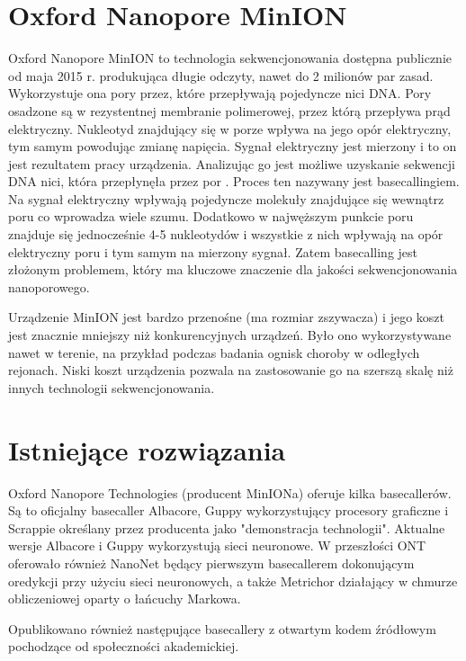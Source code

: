 \documentclass[a4paper,11pt,twoside]{report}
\theoremstyle{definition}
\begin{document}
\section{Oxford Nanopore MinION}

Oxford Nanopore MinION to technologia sekwencjonowania dostępna publicznie od maja 2015 r. produkująca długie odczyty, nawet do 2 milionów par zasad. Wykorzystuje ona pory przez, które przepływają pojedyncze nici DNA. Pory osadzone są w rezystentnej membranie polimerowej, przez którą przepływa prąd elektryczny. Nukleotyd znajdujący się w porze wpływa na jego opór elektryczny, tym samym powodując zmianę napięcia. Sygnał elektryczny jest mierzony i to on jest rezultatem pracy urządzenia. Analizując go jest możliwe uzyskanie sekwencji DNA nici, która przepłynęła przez por \cite{nanoporeHuman}. Proces ten nazywany jest basecallingiem. Na sygnał elektryczny wpływają pojedyncze molekuły znajdujące się wewnątrz poru co wprowadza wiele szumu. Dodatkowo w najwęższym punkcie poru znajduje się jednocześnie 4-5 nukleotydów i wszystkie z nich wpływają na opór elektryczny poru i tym samym na mierzony sygnał. Zatem basecalling jest złożonym problemem, który ma kluczowe znaczenie dla jakości sekwencjonowania nanoporowego.

Urządzenie MinION jest bardzo przenośne (ma rozmiar zszywacza) i jego koszt jest znacznie mniejszy niż konkurencyjnych urządzeń. Było ono wykorzystywane nawet w terenie, na przykład podczas badania ognisk choroby w odległych rejonach\cite{ebola}. Niski koszt urządzenia pozwala na zastosowanie go na szerszą skalę niż innych technologii sekwencjonowania.

\section{Istniejące rozwiązania}

Oxford Nanopore Technologies (producent MinIONa) oferuje kilka basecallerów. Są to oficjalny basecaller Albacore, Guppy wykorzystujący procesory graficzne i Scrappie określany przez producenta jako "demonstracja technologii". Aktualne wersje Albacore i Guppy wykorzystują sieci neuronowe. W przeszłości ONT oferowało również NanoNet będący pierwszym basecallerem dokonującym oredykcji przy użyciu sieci neuronowych, a także Metrichor działający w chmurze obliczeniowej oparty o łańcuchy Markowa. 

Opublikowano również następujące basecallery z otwartym kodem źródłowym pochodzące od społeczności akademickiej.
\end{document}
